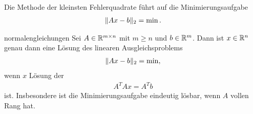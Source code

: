\begin{intro}
  Die Methode der kleinsten Fehlerquadrate führt auf die Minimierungsaufgabe
  \begin{gather}
    \lVert Ax-b\rVert_2 = \min.
  \end{gather}
\end{intro}

\begin{Satz}{normalengleichungen}
  Sei $A\in \mathbb R^{m\times n}$ mit $m\ge n$ und $b\in \mathbb R^m$. Dann ist
  $x\in\mathbb R^n$ genau dann eine Lösung des linearen Ausgleichsproblems
  \begin{gather}
    \lVert Ax-b\rVert_2 = \min,
  \end{gather}
  wenn $x$ Lösung der 
  \begin{gather}
    A^TA x = A^Tb
  \end{gather}
  ist. Insbesondere ist die Minimierungsaufgabe eindeutig lösbar, wenn
  $A$ vollen Rang hat.
\end{Satz}


